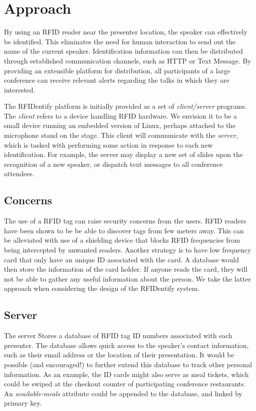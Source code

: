\documentclass{article}
\begin{document}
\section{Approach}
	By using an RFID reader near the presenter location, the speaker can effectively be identified. 
        This eliminates the need for human interaction to send out the name of the current speaker. 
        Identification information can then be distributed through established communication channels, 
        such as HTTP or Text Message.  By providing an extensible platform for distribution, all
        participants of a large conference can receive relevant alerts regarding the talks in which 
        they are interested. 


	The RFIDentify platform is initially provided as a set of \textit{client/server} programs.  The \textit{client}
        refers to a device handling RFID hardware. We envision it to be a small device
        running an embedded version of Linux, perhaps attached to the microphone stand on the stage.
        This client will communicate with the \textit{server}, which is tasked with performing some 
        action in response to each new identification.  For example, the server may display a new set of 
        slides upon the recognition of a new speaker, or dispatch text messages to all conference attendees.


        \subsection{Concerns}
	The use of a RFID tag can raise security concerns from the users. 
        RFID readers have been shown to be be able to discover tags from few meters away.
	This can be alleviated with use of a shielding device that blocks RFID frequencies from being 
        intercepted by unwanted readers. 
        Another strategy is to 	have low frequency card that only have an unique ID associated with 
        the card. 
        A database would then store the information of the card holder.
	If anyone reads the card, they will not be able to gather any useful information about the person.
        We take the latter approach when considering the design of the RFIDentify system.
	 
        \subsection{Server}
	The server Stores a database of RFID tag ID numbers associated with each presenter. 
        The database allows quick access to the speaker's contact information,
        such as their email address or the location of their presentation.
        It would be possible (and encouraged!) to further extend this database to track other 
        personal information.  As an example, the ID cards might also serve as meal tickets,
        which could be swiped at the checkout counter of participating conference restaurants.
        An \textit{available-meals} attribute could be appended to the database, and linked by primary key.
\end{document}
